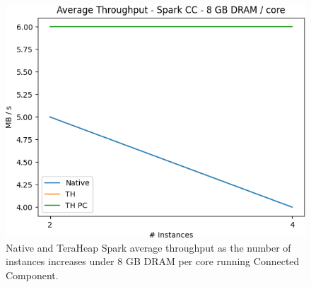 \begin{figure}[thbp]
	\centering
        \includegraphics[width=\linewidth]{./fig/CC_64_THR.png}
    \caption{Native and TeraHeap Spark average throughput
        as the number of instances increases under 8 GB DRAM per core running Connected Component.}
		\label{fig:cc_64_thr}

\end{figure}
\fi

